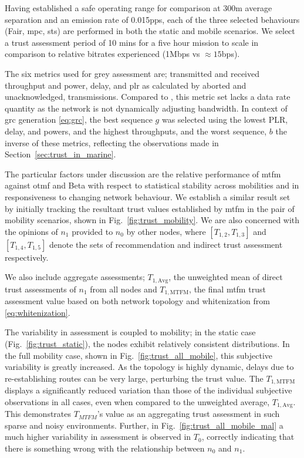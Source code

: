 Having established a safe operating range for comparison at 300m average separation and an emission rate of 0.015pps, each of the three selected behaviours (Fair, \gls{mpc}, \gls{sts}) are performed in both the static and mobile scenarios. 
We select a trust assessment period of 10 mins for a five hour mission to scale in comparison to relative bitrates experienced (1Mbps vs $\approx15$bps).

The six metrics used for grey assessment are; transmitted and received throughput and power, delay, and \gls{plr} as calculated by aborted and unacknowledged, transmissions.
Compared to \cite{Guo11}, this metric set lacks a data rate quantity as the network is not dynamically adjusting bandwidth.
In context of \gls{grc} generation \eqref{eq:grc}, the best sequence $g$ was selected using the lowest PLR, delay, and powers, and the highest throughputs, and the worst sequence, $b$ the inverse of these metrics, reflecting the observations made in Section~\ref{sec:trust_in_marine}.

The particular factors under discussion are the relative performance of \gls{mtfm} against \gls{otmf} and Beta with respect to statistical stability across mobilities and in responsiveness to changing network behaviour. 
We establish a similar result set by initially tracking the resultant trust values established by \gls{mtfm} in the pair of mobility scenarios, shown in Fig.~\ref{fig:trust_mobility}.
We are also concerned with the opinions of $n_1$ provided to $n_0$ by other nodes, where $[T_{1,2},T_{1,3}]$ and $[T_{1,4},T_{1,5}]$ denote the sets of recommendation and indirect trust assessment respectively.

We also include aggregate assessments; $T_{1,\text{Avg}}$, the unweighted mean of direct trust assessments of $n_1$ from all nodes and $T_{1,\text{MTFM}}$, the final \gls{mtfm} trust assessment value based on both network topology and whitenization from \eqref{eq:whitenization}.

The variability in assessment is coupled to mobility; in the static case (Fig.~\ref{fig:trust_static}), the nodes exhibit relatively consistent distributions.
In the full mobility case, shown in Fig.~\ref{fig:trust_all_mobile}, this subjective variability is greatly increased. 
As the topology is highly dynamic, delays due to re-establishing routes can be very large, perturbing the trust value.
The $T_{1,\text{MTFM}}$ displays a significantly reduced variation than those of the individual subjective observations in all cases, even when compared to the unweighted average, $T_{1,\text{Avg}}$.
This demonstrates $T_{MTFM}$'s value as an aggregating trust assessment in such sparse and noisy environments.
Further, in Fig.~\ref{fig:trust_all_mobile_mal} a much higher variability in assessment is observed in $T_0$, correctly indicating that there is something wrong with the relationship between $n_0$ and $n_1$.

